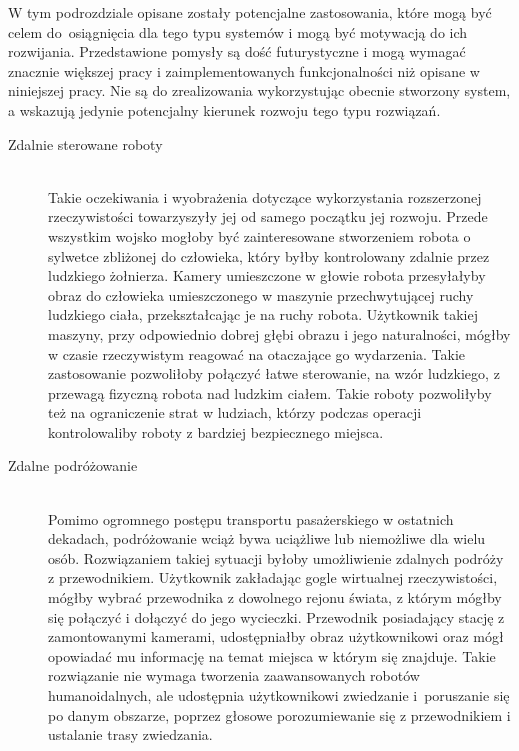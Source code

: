 \documentclass[a4paper,11pt,twoside]{report}
\theoremstyle{definition}
\begin{document}
W tym podrozdziale opisane zostały potencjalne zastosowania, które mogą być celem do~osiągnięcia dla tego typu systemów i mogą być motywacją do ich rozwijania. Przedstawione pomysły są dość futurystyczne i mogą wymagać znacznie większej pracy i zaimplementowanych funkcjonalności niż opisane w niniejszej pracy. Nie są do zrealizowania wykorzystując obecnie stworzony system, a wskazują jedynie potencjalny kierunek rozwoju tego typu rozwiązań.

\begin{description}
\item [Zdalnie sterowane roboty] \hfill \\
Takie oczekiwania i wyobrażenia dotyczące wykorzystania rozszerzonej rzeczywistości towarzyszyły jej od samego początku jej rozwoju. Przede wszystkim wojsko mogłoby być zainteresowane stworzeniem robota o sylwetce zbliżonej do człowieka, który byłby kontrolowany zdalnie przez ludzkiego żołnierza. Kamery umieszczone w głowie robota przesyłałyby obraz do człowieka umieszczonego w maszynie przechwytującej ruchy ludzkiego ciała, przekształcając je na ruchy robota. Użytkownik takiej maszyny, przy odpowiednio dobrej głębi obrazu i jego naturalności, mógłby w czasie rzeczywistym reagować na otaczające go wydarzenia. Takie zastosowanie pozwoliłoby połączyć łatwe sterowanie, na wzór ludzkiego, z przewagą fizyczną robota nad ludzkim ciałem. Takie roboty pozwoliłyby też na ograniczenie strat w ludziach, którzy podczas operacji kontrolowaliby roboty z bardziej bezpiecznego miejsca.
  
\item [Zdalne podróżowanie] \hfill \\
Pomimo ogromnego postępu transportu pasażerskiego w ostatnich dekadach, podróżowanie wciąż bywa uciążliwe lub niemożliwe dla wielu osób. Rozwiązaniem takiej sytuacji byłoby umożliwienie zdalnych podróży z przewodnikiem. Użytkownik zakładając gogle wirtualnej rzeczywistości, mógłby wybrać przewodnika z dowolnego rejonu świata, z którym mógłby się połączyć i dołączyć do jego wycieczki. Przewodnik posiadający stację z zamontowanymi kamerami, udostępniałby obraz użytkownikowi oraz mógł opowiadać mu informację na temat miejsca w którym się znajduje. Takie rozwiązanie nie wymaga tworzenia zaawansowanych robotów humanoidalnych, ale udostępnia użytkownikowi zwiedzanie i~poruszanie się po danym obszarze, poprzez głosowe porozumiewanie się z przewodnikiem i ustalanie trasy zwiedzania.
\end{description}
\end{document}
